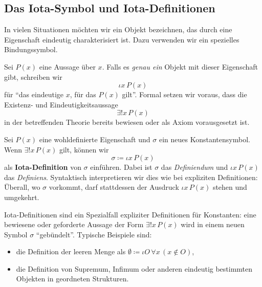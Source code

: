 \documentclass[main.tex]{subfiles}
\begin{document}
\subsection{Das Iota-Symbol und Iota-Definitionen}

In vielen Situationen möchten wir ein Objekt bezeichnen, das durch
eine Eigenschaft eindeutig charakterisiert ist. Dazu verwenden wir
ein spezielles Bindungssymbol.

\begin{definition}
\label{def:iota-symbol}
Sei \(P(x)\) eine Aussage über \(x\). Falls es \emph{genau ein}
Objekt mit dieser Eigenschaft gibt, schreiben wir
\[
  \iota x\,P(x)
\]
für \enquote{das eindeutige \(x\), für das \(P(x)\) gilt}. Formal
setzen wir voraus, dass die Existenz- und Eindeutigkeitsaussage
\[
  \exists! x\,P(x)
\]
in der betreffenden Theorie bereits bewiesen oder als Axiom
vorausgesetzt ist.
\end{definition}

\begin{definition}
\label{def:iota-definition}
Sei \(P(x)\) eine wohldefinierte Eigenschaft und \(\sigma\) ein
neues Konstantensymbol. Wenn \(\exists! x\,P(x)\) gilt, können wir
\[
  \sigma \coloneqq \iota x\,P(x)
\]
als \textbf{Iota-Definition} von \(\sigma\) einführen. Dabei ist
\(\sigma\) das \emph{Definiendum} und \(\iota x\,P(x)\) das
\emph{Definiens}. Syntaktisch interpretieren wir dies wie bei
expliziten Definitionen: Überall, wo \(\sigma\) vorkommt, darf
stattdessen der Ausdruck \(\iota x\,P(x)\) stehen und umgekehrt.
\end{definition}

\begin{remark}
Iota-Definitionen sind ein Spezialfall expliziter Definitionen
für Konstanten: eine bewiesene oder geforderte Aussage der Form
\(\exists! x\,P(x)\) wird in einem neuen Symbol \(\sigma\)
\enquote{gebündelt}. Typische Beispiele sind:
\begin{itemize}
  \item die Definition der leeren Menge als
        \(\emptyset \coloneqq \iota O\,\forall x\,(x\notin O)\),
  \item die Definition von Supremum, Infimum oder anderen
        eindeutig bestimmten Objekten in geordneten Strukturen.
\end{itemize}
\end{remark}
\end{document}
